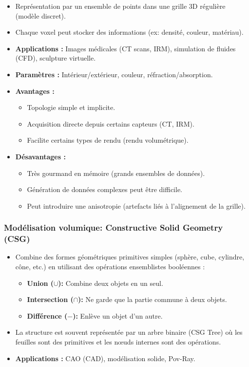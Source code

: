 \documentclass{article}
\begin{document}
\begin{itemize}
    \item Représentation par un ensemble de points dans une grille 3D régulière (modèle discret).
    \item Chaque voxel peut stocker des informations (ex: densité, couleur, matériau).
    \item \textbf{Applications :} Images médicales (CT scans, IRM), simulation de fluides (CFD), sculpture virtuelle.
    \item \textbf{Paramètres :} Intérieur/extérieur, couleur, réfraction/absorption.
    \item \textbf{Avantages :}
        \begin{itemize}
            \item Topologie simple et implicite.
            \item Acquisition directe depuis certains capteurs (CT, IRM).
            \item Facilite certains types de rendu (rendu volumétrique).
        \end{itemize}
    \item \textbf{Désavantages :}
        \begin{itemize}
            \item Très gourmand en mémoire (grands ensembles de données).
            \item Génération de données complexes peut être difficile.
            \item Peut introduire une anisotropie (artefacts liés à l'alignement de la grille).
        \end{itemize}
\end{itemize}

\subsubsection{Modélisation volumique: Constructive Solid Geometry (CSG)}

\begin{itemize}
    \item Combine des formes géométriques primitives simples (sphère, cube, cylindre, cône, etc.) en utilisant des opérations ensemblistes booléennes :
        \begin{itemize}
            \item \textbf{Union ($\cup$):} Combine deux objets en un seul.
            \item \textbf{Intersection ($\cap$):} Ne garde que la partie commune à deux objets.
            \item \textbf{Différence ($-$):} Enlève un objet d'un autre.
        \end{itemize}
    \item La structure est souvent représentée par un arbre binaire (CSG Tree) où les feuilles sont des primitives et les nœuds internes sont des opérations.
    \item \textbf{Applications :} CAO (CAD), modélisation solide, Pov-Ray.
\end{itemize}
\end{document}
